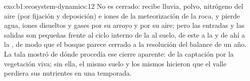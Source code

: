 \begin{solution}{exo:b1:ecosystem-dynamics:12}
No es cerrado: recibe lluvia, polvo, nitrógeno del aire (por fijación y
deposición) e iones de la meteorización de la roca, y pierde agua, iones
disueltos y gases por su arroyo y por su aire; pero las entradas y las
salidas son pequeñas frente al ciclo interno de la  al suelo, de
este a la  y de ahí a la , de modo que el bosque parece cerrado a la
resolución del balance de un año. La tala mostró de dónde procedía ese
cierre aparente: de la captación por la vegetación viva; sin ella, el mismo
suelo y los mismos  hicieron que el valle perdiera sus
nutrientes en una temporada.
\end{solution}

